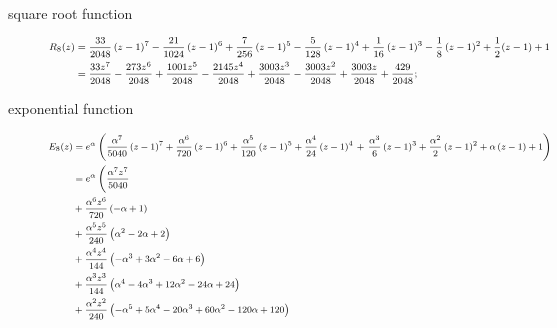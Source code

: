 \begin{description}
\begin{displaymath}
\begin{split}
    \end{split}
\end{displaymath}
\item[square root function]
\begin{displaymath}
\footnotesize
    \begin{split}
        R_{8}{\left (z \right )}  &= \frac{33}{2048} \left(z - 1\right)^{7} - \frac{21}{1024} \left(z - 1\right)^{6} + \frac{7}{256} \left(z - 1\right)^{5} - \frac{5}{128} \left(z - 1\right)^{4}
                              + \frac{1}{16} \left(z - 1\right)^{3} - \frac{1}{8} \left(z - 1\right)^{2} + \frac{1}{2}(z-1) + 1 \\
                              &= \frac{33 z^{7}}{2048} - \frac{273 z^{6}}{2048} + \frac{1001 z^{5}}{2048} - \frac{2145 z^{4}}{2048} + \frac{3003 z^{3}}{2048} - \frac{3003 z^{2}}{2048} + \frac{3003 z}{2048} + \frac{429}{2048};
    \end{split}
\end{displaymath}
\item[exponential function]
\begin{displaymath}
\footnotesize
    \begin{split}
        E_{8}{\left (z \right )}    &= e^{\alpha} \left(\frac{\alpha^{7} }{5040} \left(z - 1\right)^{7} + \frac{\alpha^{6} }{720} \left(z - 1\right)^{6} + \frac{\alpha^{5} }{120} \left(z - 1\right)^{5} + \frac{\alpha^{4} }{24} \left(z - 1\right)^{4}\right.
                                + \left. \frac{\alpha^{3} }{6} \left(z - 1\right)^{3} + \frac{\alpha^{2} }{2} \left(z - 1\right)^{2} + \alpha \left(z - 1\right)  + 1\right)\\
                                &= e^{\alpha}\left(\frac{\alpha^{7} z^{7}}{5040}\right. \\
                                &+ \frac{\alpha^{6} z^{6}}{720} \left(- \alpha + 1\right) \\
                                &+ \frac{\alpha^{5} z^{5}}{240} \left(\alpha^{2} - 2 \alpha + 2\right) \\
                                &+ \frac{\alpha^{4} z^{4}}{144} \left(- \alpha^{3} + 3 \alpha^{2} - 6 \alpha + 6\right) \\
                                &+ \frac{\alpha^{3} z^{3}}{144} \left(\alpha^{4} - 4 \alpha^{3} + 12 \alpha^{2} - 24 \alpha + 24\right) \\
                                &+ \frac{\alpha^{2} z^{2}}{240} \left(- \alpha^{5} + 5 \alpha^{4} - 20 \alpha^{3} + 60 \alpha^{2} - 120 \alpha + 120\right) \\

\end{split}
\end{displaymath}
\end{description}
